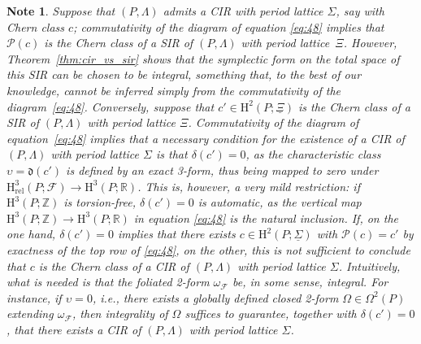 \documentclass[pdftex]{sigma}
\numberwithin{equation}{section}
\newtheorem{Note}[Theorem]{Note}
\newcommand{\PM}{(P,\Lambda)} %
\newcommand{\HH}{\mathrm{H}}
\newcommand{\RR}{\mathbb{R}}
\newcommand{\ZZ}{\mathbb{Z}}
\begin{document}
\begin{Note}\label{obs:interpretation}
Suppose that $\PM$ admits a CIR with period lattice $\Sigma$, say with Chern class $c$; commutativity of the diagram of equation \eqref{eq:48} implies that $\mathcal{P}(c)$ is the Chern class of a SIR of $\PM$ with period lattice~$\Xi$. However, Theorem~\ref{thm:cir_vs_sir} shows that the symplectic form on the total space of this SIR can be chosen to be integral, something that, to the best of our knowledge, cannot be inferred simply from the commutativity of the diagram~\eqref{eq:48}. Conversely, suppose that $c' \in \HH^2(P;\underline{\Xi})$ is the Chern class of a SIR of $\PM$ with period lattice $\Xi$. Commutativity of the diagram of equation~\eqref{eq:48} implies that a necessary condition for the existence of a CIR of $\PM$ with period lattice $\Sigma$ is that $\delta(c') = 0$, as the characteristic class $\upsilon = \mathfrak{d}(c')$ is def\/ined by an exact 3-form, thus being mapped to zero under $\HH^3_{\mathrm{rel}}(P;\mathcal{F}) \to \HH^3(P;\RR)$. This is, however, a very mild restriction: if $\HH^3(P;\ZZ)$ is torsion-free, $\delta(c') =0$ is automatic, as the vertical map $\HH^3(P;\ZZ) \to \HH^3(P;\RR)$ in equation \eqref{eq:48} is the natural inclusion. If, on the one hand, $\delta(c') =0$ implies that there exists $c \in \HH^2(P;\underline{\Sigma})$ with $\mathcal{P}(c) = c'$ by exactness of the top row of \eqref{eq:48}, on the other, this is not suf\/f\/icient to conclude that $c$ is the Chern class of a CIR of $\PM$ with period lattice $\Sigma$. Intuitively, what is needed is that the foliated 2-form $\omega_{\mathcal{F}}$ be, in some sense, {\it integral}. For instance, if $\upsilon = 0$, i.e., there exists a globally def\/ined closed 2-form $\Omega \in \Omega^2(P)$ extending $\omega_{\mathcal{F}}$, then integrality of $\Omega$ suf\/f\/ices to guarantee, together with $\delta(c') = 0$, that there exists a CIR of $\PM$ with period lattice $\Sigma$.
\end{Note}
\end{document}
